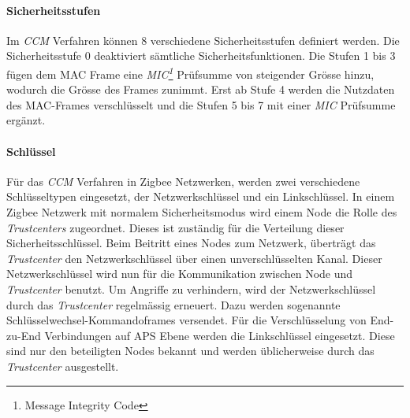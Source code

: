 \paragraph{Sicherheitsstufen}
Im \textit{CCM} Verfahren können 8 verschiedene Sicherheitsstufen definiert werden.
Die Sicherheitsstufe 0 deaktiviert sämtliche Sicherheitsfunktionen.
Die Stufen 1 bis 3 fügen dem MAC Frame eine \textit{MIC\footnote{Message Integrity Code}} Prüfsumme von steigender Grösse hinzu, wodurch die Grösse des Frames zunimmt.
Erst ab Stufe 4 werden die Nutzdaten des MAC-Frames verschlüsselt und die Stufen 5 bis 7 mit einer \textit{MIC} Prüfsumme ergänzt.

\paragraph{Schlüssel}
Für das \textit{CCM} Verfahren in Zigbee Netzwerken, werden zwei verschiedene Schlüsseltypen eingesetzt, der Netzwerkschlüssel und ein Linkschlüssel.
In einem Zigbee Netzwerk mit normalem Sicherheitsmodus wird einem Node die Rolle des \textit{Trustcenters} zugeordnet.
Dieses ist zuständig für die Verteilung dieser Sicherheitsschlüssel.
Beim Beitritt eines Nodes zum Netzwerk, überträgt das \textit{Trustcenter} den Netzwerkschlüssel über einen unverschlüsselten Kanal.
Dieser Netzwerkschlüssel wird nun für die Kommunikation zwischen Node und \textit{Trustcenter} benutzt.
Um Angriffe zu verhindern, wird der Netzwerkschlüssel durch das \textit{Trustcenter} regelmässig erneuert.
Dazu werden sogenannte Schlüsselwechsel-Kommandoframes versendet.
Für die Verschlüsselung von End-zu-End Verbindungen auf APS Ebene werden die Linkschlüssel eingesetzt.
Diese sind nur den beteiligten Nodes bekannt und werden üblicherweise durch das \textit{Trustcenter} ausgestellt.

